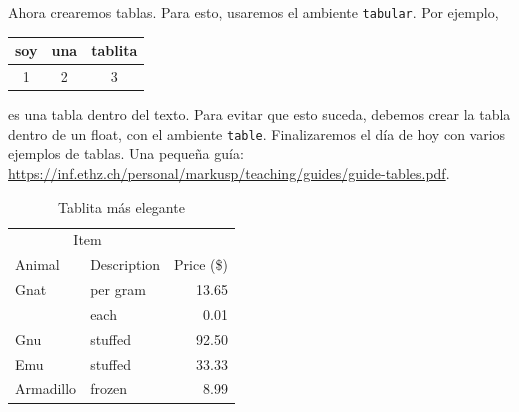 \documentclass[a4paper,article,oneside,11pt]{memoir}
\begin{document}
Ahora crearemos tablas. Para esto, usaremos el ambiente \texttt{tabular}. Por ejemplo, 
\begin{tabular}{@{}ccc@{}}
    \toprule %
    soy & una & tablita \\ %
    \midrule
    1 & 2 & 3 \\
    \bottomrule
\end{tabular}
es una tabla dentro del texto. Para evitar que esto suceda, debemos crear la tabla dentro de un float, con el ambiente \texttt{table}. Finalizaremos el día de hoy con varios ejemplos de tablas. Una pequeña guía: \url{https://inf.ethz.ch/personal/markusp/teaching/guides/guide-tables.pdf}.

\begin{table}[htp]
    \centering
    \begin{tabular}{@{}llr@{}}
        \toprule
        \multicolumn{2}{c}{Item} \\ 
        \cmidrule(r){1-2}
        Animal & Description & Price (\$)\\ 
        \midrule
        Gnat  & per gram  & 13.65 \\& each      & 0.01 \\
        Gnu   & stuffed   & 92.50 \\Emu   & stuffed   & 33.33 \\
        Armadillo & frozen & 8.99 \\ 
        \bottomrule
    \end{tabular}
    \caption{Tablita más elegante}
    \label{tab:tablita animales}
\end{table}
\end{document}
